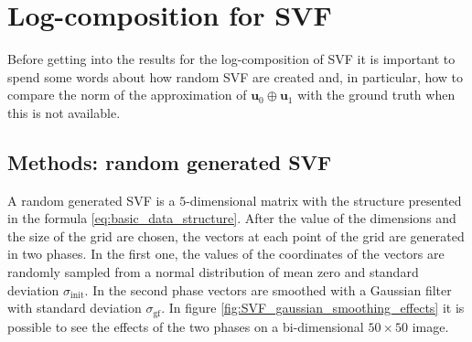 \section{Log-composition for SVF}
Before getting into the results for the log-composition of SVF it is important to spend some words about how random SVF are created and, in particular, how to compare the norm of the approximation of $\mathbf{u}_0\oplus \mathbf{u}_1$ with the ground truth when this is not available.

\subsection{Methods: random generated SVF}
A random generated SVF is a $5$-dimensional matrix with the structure presented in the formula \ref{eq:basic_data_structure}. 
After the value of the dimensions and the size of the grid are chosen, the vectors at each point of the grid are generated in two phases. 
In the first one, the values of the coordinates of the vectors are randomly sampled from a normal distribution of mean zero and standard deviation $\sigma_{\text{init}}$. 
In the second phase vectors are smoothed with a Gaussian filter with standard deviation $\sigma_{\text{gf}}$. In figure \ref{fig:SVF_gaussian_smoothing_effects} it is possible to see the effects of the two phases on a bi-dimensional $50\times 50$ image.

